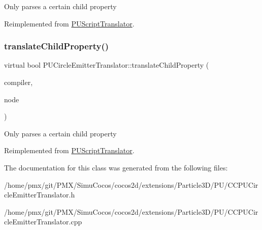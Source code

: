 Only parses a certain child property 

Reimplemented from \hyperlink{classPUScriptTranslator_a0374d83a8a04e57918975d525e0f8fe8}{P\+U\+Script\+Translator}.

\mbox{\label{classPUCircleEmitterTranslator_a834ed9590bdcbdd4ba6752c4a1dede24}} 
\subsubsection{\texorpdfstring{translate\+Child\+Property()}{translateChildProperty()}\hspace{0.1cm}{\footnotesize\ttfamily [2/2]}}
{\footnotesize\ttfamily virtual bool P\+U\+Circle\+Emitter\+Translator\+::translate\+Child\+Property (\begin{DoxyParamCaption}\item[{\hyperlink{classPUScriptCompiler}{P\+U\+Script\+Compiler} $\ast$}]{compiler,  }\item[{\hyperlink{classPUAbstractNode}{P\+U\+Abstract\+Node} $\ast$}]{node }\end{DoxyParamCaption})\hspace{0.3cm}{\ttfamily [virtual]}}

Only parses a certain child property 

Reimplemented from \hyperlink{classPUScriptTranslator_a0374d83a8a04e57918975d525e0f8fe8}{P\+U\+Script\+Translator}.



The documentation for this class was generated from the following files\+:\begin{DoxyCompactItemize}
\item 
/home/pmx/git/\+P\+M\+X/\+Simu\+Cocos/cocos2d/extensions/\+Particle3\+D/\+P\+U/C\+C\+P\+U\+Circle\+Emitter\+Translator.\+h\item 
/home/pmx/git/\+P\+M\+X/\+Simu\+Cocos/cocos2d/extensions/\+Particle3\+D/\+P\+U/C\+C\+P\+U\+Circle\+Emitter\+Translator.\+cpp\end{DoxyCompactItemize}
